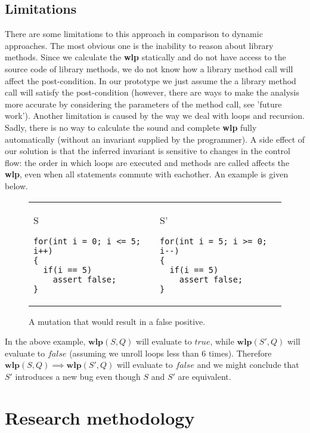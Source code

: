 \documentclass[a4paper, fleqn]{article}
\newcommand{\wlp}{\textbf{wlp}\xspace}
\begin{document}
\subsection{Limitations}
There are some limitations to this approach in comparison to dynamic approaches. The most obvious one is the inability to reason about library methods. Since we calculate the \wlp statically and do not have access to the source code of library methods, we do not know how a library method call will affect the post-condition. In our prototype we just assume the a library method call will satisfy the post-condition (however, there are ways to make the analysis more accurate by considering the parameters of the method call, see 'future work'). Another limitation is caused by the way we deal with loops and recursion. Sadly, there is no way to calculate the sound and complete \wlp fully automatically (without an invariant supplied by the programmer). A side effect of our solution is that the inferred invariant is sensitive to changes in the control flow: the order in which loops are executed and methods are called affects the \wlp, even when all statements commute with eachother. An example is given below.

\begin{center}
\begin{figure}[H]
\begin{tabular}{ p{5.6cm}| p{5.5cm}}
S
\begin{lstlisting}
for(int i = 0; i <= 5; i++)
{
  if(i == 5)
    assert false;
}
\end{lstlisting}
&
S'
\begin{lstlisting}
for(int i = 5; i >= 0; i--)
{
  if(i == 5)
    assert false;
}
\end{lstlisting}
\end{tabular}
\caption{A mutation that would result in a false positive.}
\label{false positive}
\end{figure}
\end{center}
In the above example, $\wlp(S, Q)$ will evaluate to $true$, while $\wlp(S', Q)$ will evaluate to $false$ (assuming we unroll loops less than 6 times). Therefore $\wlp(S, Q) \implies \wlp(S', Q)$ will evaluate to $false$ and we might conclude that $S'$ introduces a new bug even though $S$ and $S'$ are equivalent.




\section{Research methodology}
\end{document}
